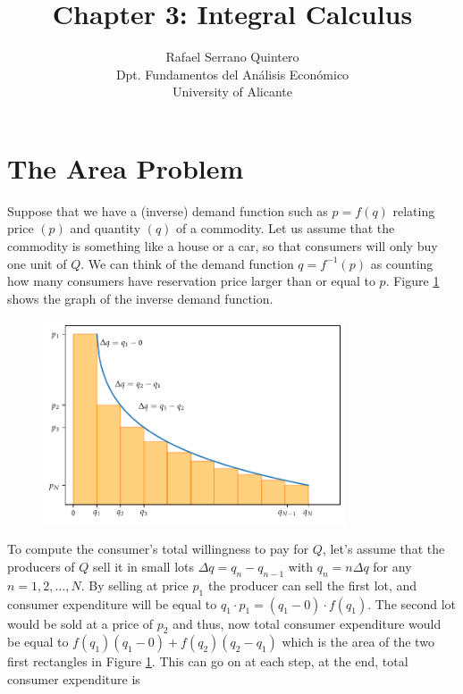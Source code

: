 \documentclass[a4paper,11pt]{article}
\title{Chapter 3: Integral Calculus}
\author{Rafael Serrano Quintero \\
Dpt. Fundamentos del An\'alisis Econ\'omico \\
University of Alicante}
\date{}
\theoremstyle{definition}
\theoremstyle{plain}
\begin{document}
      

\maketitle

\section{The Area Problem}\label{the-area-problem}

Suppose that we have a (inverse) demand function such as \(p = f(q)\) relating price \((p)\) and quantity \((q)\) of a commodity. Let us assume that the commodity is something like a house or a car, so that consumers will only buy one unit of \(Q\). We can think of the demand function \(q = f^{-1}(p)\) as counting how many consumers have reservation price larger than or equal to \(p\). Figure \ref{fig:area_under_curve} shows the graph of the inverse demand function.

\begin{figure}[htbp]
	\centering 
 		\includegraphics[width = 0.8\textwidth]{Ch3_files/Ch3_3_0.pdf}
		\caption{}
		\label{fig:area_under_curve}
\end{figure}
    
To compute the consumer's total willingness to pay for \(Q\), let's assume that the producers of \(Q\) sell it in small lots \(\Delta q = q_{n} - q_{n-1}\) with \(q_n = n\Delta q\) for any \(n = 1,2,\ldots,N\). By selling at price \(p_1\) the producer can sell
the first lot, and consumer expenditure will be equal to \(q_1 \cdot p_1 = (q_1-0)\cdot f(q_1)\). The second lot would be sold at a price of \(p_2\) and thus, now total consumer expenditure would be equal to \(f(q_1)(q_1 - 0) + f(q_2)(q_2 - q_1)\) which is the area of the two first rectangles in Figure \ref{fig:area_under_curve}. This can go on at each step, at the end, total consumer expenditure is
\end{document}
